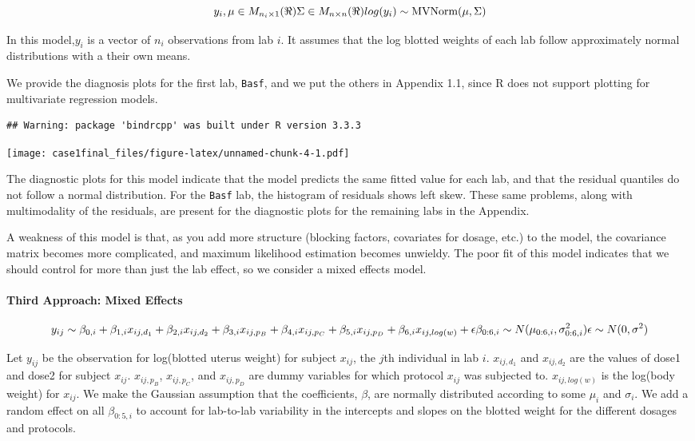 \documentclass[]{article}
\let\oldparagraph\paragraph
\renewcommand{\paragraph}[1]{\oldparagraph{#1}\mbox{}}
\begin{document}
\[
y_i, \mu \in M_{n_i \times 1}( \Re)
\\
\Sigma \in M_{n \times n}( \Re)
\\ 
log(y_i) \sim \text{MVNorm}(\mu, \Sigma)
\]

In this model,\(y_i\) is a vector of \(n_i\) observations from lab
\(i\). It assumes that the log blotted weights of each lab follow
approximately normal distributions with a their own means.

We provide the diagnosis plots for the first lab, \texttt{Basf}, and we
put the others in Appendix 1.1, since R does not support plotting for
multivariate regression models.

\begin{verbatim}
## Warning: package 'bindrcpp' was built under R version 3.3.3
\end{verbatim}

\texttt{[image: case1final\_files/figure-latex/unnamed-chunk-4-1.pdf]}

The diagnostic plots for this model indicate that the model predicts the
same fitted value for each lab, and that the residual quantiles do not
follow a normal distribution. For the \texttt{Basf} lab, the histogram
of residuals shows left skew. These same problems, along with
multimodality of the residuals, are present for the diagnostic plots for
the remaining labs in the Appendix.

A weakness of this model is that, as you add more structure (blocking
factors, covariates for dosage, etc.) to the model, the covariance
matrix becomes more complicated, and maximum likelihood estimation
becomes unwieldy. The poor fit of this model indicates that we should
control for more than just the lab effect, so we consider a mixed
effects model.

\paragraph{Third Approach: Mixed
Effects}\label{third-approach-mixed-effects}

\[
y_{ij} \sim \beta_{0,i} + \beta_{1,i}x_{ij,d_1} + \beta_{2,i}x_{ij,d_2} + \beta_{3,i}x_{ij,p_B} + \beta_{4,i}x_{ij,p_C} + \beta_{5,i}x_{ij,p_D} + \beta_{6,i}x_{ij,log(w)} + \epsilon
\\
\beta_{0:6,i} \sim N(\mu_{0:6,i}, \sigma^2_{0:6,i})
\\
\epsilon \sim N(0, \sigma^2)
\]

Let \(y_{ij}\) be the observation for log(blotted uterus weight) for
subject \(x_{ij}\), the \(j\)th individual in lab \(i\). \(x_{ij,d_1}\)
and \(x_{ij,d_2}\) are the values of dose1 and dose2 for subject
\(x_{ij}\). \(x_{ij,p_B}\), \(x_{ij,p_C}\), and \(x_{ij,p_D}\) are dummy
variables for which protocol \(x_{ij}\) was subjected to.
\(x_{ij,log(w)}\) is the log(body weight) for \(x_{ij}\). We make the
Gaussian assumption that the coefficients, \(\beta\), are normally
distributed according to some \(\mu_i\) and \(\sigma_i\). We add a
random effect on all \(\beta_{0:5,i}\) to account for lab-to-lab
variability in the intercepts and slopes on the blotted weight for the
different dosages and protocols.
\end{document}
